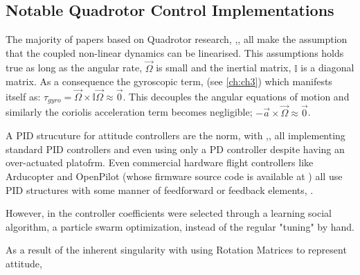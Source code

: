 \subsection{Notable Quadrotor Control Implementations}
\label{subsec:ch1.lit.notablecontrol}
The majority of papers based on Quadrotor research, \cite{quaddynamics},\cite{optimizedPID}, \cite{fourrotorrobot} all make the assumption that the coupled non-linear dynamics can be linearised. This assumptions holds true as long as the angular rate, $\vec{\Omega}$ is small and the inertial matrix, $\mathbb{I}$ is a diagonal matrix. As a consequence the gyroscopic term, (see \ref{ch:ch3}) which manifests itself as: $\tau _{gyro} = \vec{\Omega} \times \mathbb{I} \vec{\Omega} \approx \vec{0}$. This decouples the angular equations of motion and similarly the coriolis acceleration term becomes negligible; $-\vec{a} \times \vec{\Omega} \approx \vec{0}$.
\par
A PID strucuture for attitude controllers are the norm, with \cite{optimizedPID},\cite{quaddynamics},\cite{tiltpropellerflight} all implementing standard PID controllers and even \cite{singleaxistilting} using only a PD controller despite having an over-actuated platofrm. Even commercial hardware flight controllers like Arducopter\cite{arducopter} and OpenPilot \cite{openpilot}(whose firmware source code is available at \cite{openpilotgit}) all use PID structures with some manner of feedforward or feedback elements, \cite{buildyourownquad}.

However, in \cite{optimizedPID} the controller coefficients were selected through a learning social algorithm, a particle swarm optimization, instead of the regular "tuning" by hand. 
\par
As a result of the inherent singularity with using Rotation Matrices to represent attitude, 
